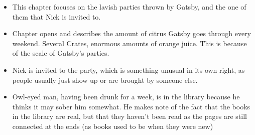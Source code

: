 \message{ !name(gatsbynotes.tex)}\documentclass[12pt]{article}
\begin{document}

\begin{itemize}
\item This chapter focuses on the lavish parties thrown by Gatsby, and the one of them that Nick is invited to.
\item Chapter opens and describes the amount of citrus Gatsby goes through every weekend.  Several Crates, enormous amounts of orange juice.  This is because of the scale of Gatsby's parties.
\item Nick is invited to the party, which is something unusual in its own right, as people usually just show up or are brought by someone else.
\item Owl-eyed man, having been drunk for a week, is in the library because he thinks it may sober him somewhat.  He makes note of the fact that the books in the library are real, but that they haven't been read as the pages are still connected at the ends (as books used to be when they were new)
\end{itemize}
\end{document}

